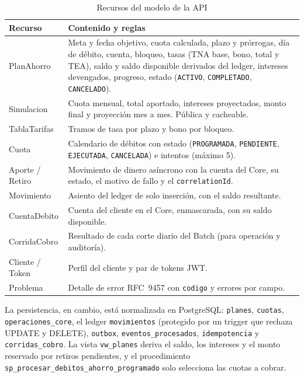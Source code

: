 \begin{table}[H]
\centering
\caption{Recursos del modelo de la API}\label{tab:recursos}
\begin{tabularx}{\linewidth}{@{}>{\ttfamily\raggedright}p{3.1cm} X@{}}
\toprule
\normalfont\textbf{Recurso} & \textbf{Contenido y reglas} \\
\midrule
PlanAhorro & Meta y fecha objetivo, cuota calculada, plazo y prórrogas, día de débito, cuenta, bloqueo, tasas (TNA base, bono, total y TEA), saldo y saldo disponible derivados del ledger, intereses devengados, progreso, estado (\texttt{ACTIVO}, \texttt{COMPLETADO}, \texttt{CANCELADO}). \\
Simulacion & Cuota mensual, total aportado, intereses proyectados, monto final y proyección mes a mes. Pública y cacheable. \\
TablaTarifas & Tramos de tasa por plazo y bono por bloqueo. \\
Cuota & Calendario de débitos con estado (\texttt{PROGRAMADA}, \texttt{PENDIENTE}, \texttt{EJECUTADA}, \texttt{CANCELADA}) e intentos (máximo 5). \\
Aporte / Retiro & Movimiento de dinero asíncrono con la cuenta del Core, su estado, el motivo de fallo y el \texttt{correlationId}. \\
Movimiento & Asiento del ledger de solo inserción, con el saldo resultante. \\
CuentaDebito & Cuenta del cliente en el Core, enmascarada, con su saldo disponible. \\
CorridaCobro & Resultado de cada corte diario del Batch (para operación y auditoría). \\
Cliente / Token & Perfil del cliente y par de tokens JWT. \\
Problema & Detalle de error RFC~9457 con \texttt{codigo} y errores por campo. \\
\bottomrule
\end{tabularx}
\end{table}

La persistencia, en cambio, está normalizada en PostgreSQL: \texttt{planes}, \texttt{cuotas}, \texttt{operaciones\_core}, el ledger \texttt{movimientos} (protegido por un trigger que rechaza UPDATE y DELETE), \texttt{outbox}, \texttt{eventos\_procesados}, \texttt{idempotencia} y \texttt{corridas\_cobro}. La vista \texttt{vw\_planes} deriva el saldo, los intereses y el monto reservado por retiros pendientes, y el procedimiento \texttt{sp\_procesar\_debitos\_ahorro\_programado} solo selecciona las cuotas a cobrar.

